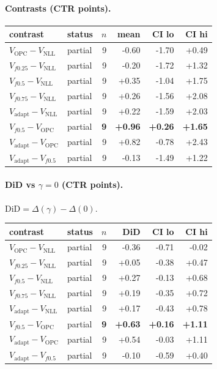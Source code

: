 \documentclass[10pt,a4paper]{article}
\begin{document}
\paragraph{Contrasts (CTR points).}
{\centering\small\begin{tabular}{llrrrr}
\toprule contrast & status & $n$ & mean & CI lo & CI hi \\
\midrule
$V_{\mathrm{OPC}}-V_{\mathrm{NLL}}$ & partial & 9 & -0.60 & -1.70 & +0.49 \\
$V_{f0.25}-V_{\mathrm{NLL}}$ & partial & 9 & -0.20 & -1.72 & +1.32 \\
$V_{f0.5}-V_{\mathrm{NLL}}$ & partial & 9 & +0.35 & -1.04 & +1.75 \\
$V_{f0.75}-V_{\mathrm{NLL}}$ & partial & 9 & +0.26 & -1.56 & +2.08 \\
$V_{\mathrm{adapt}}-V_{\mathrm{NLL}}$ & partial & 9 & +0.22 & -1.59 & +2.03 \\
\textbf{$V_{f0.5}-V_{\mathrm{OPC}}$} & partial & \textbf{9} & \textbf{+0.96} & \textbf{+0.26} & \textbf{+1.65} \\
$V_{\mathrm{adapt}}-V_{\mathrm{OPC}}$ & partial & 9 & +0.82 & -0.78 & +2.43 \\
$V_{\mathrm{adapt}}-V_{f0.5}$ & partial & 9 & -0.13 & -1.49 & +1.22 \\
\bottomrule\end{tabular}\par}
\paragraph{DiD vs $\gamma=0$ (CTR points).} $\mathrm{DiD}=\Delta(\gamma)-\Delta(0)$.
{\centering\small\begin{tabular}{llrrrr}
\toprule contrast & status & $n$ & DiD & CI lo & CI hi \\
\midrule
$V_{\mathrm{OPC}}-V_{\mathrm{NLL}}$ & partial & 9 & -0.36 & -0.71 & -0.02 \\
$V_{f0.25}-V_{\mathrm{NLL}}$ & partial & 9 & +0.05 & -0.38 & +0.47 \\
$V_{f0.5}-V_{\mathrm{NLL}}$ & partial & 9 & +0.27 & -0.13 & +0.68 \\
$V_{f0.75}-V_{\mathrm{NLL}}$ & partial & 9 & +0.19 & -0.35 & +0.72 \\
$V_{\mathrm{adapt}}-V_{\mathrm{NLL}}$ & partial & 9 & +0.17 & -0.43 & +0.78 \\
\textbf{$V_{f0.5}-V_{\mathrm{OPC}}$} & partial & \textbf{9} & \textbf{+0.63} & \textbf{+0.16} & \textbf{+1.11} \\
$V_{\mathrm{adapt}}-V_{\mathrm{OPC}}$ & partial & 9 & +0.54 & -0.03 & +1.11 \\
$V_{\mathrm{adapt}}-V_{f0.5}$ & partial & 9 & -0.10 & -0.59 & +0.40 \\
\bottomrule\end{tabular}\par}
\bigskip
\end{document}

